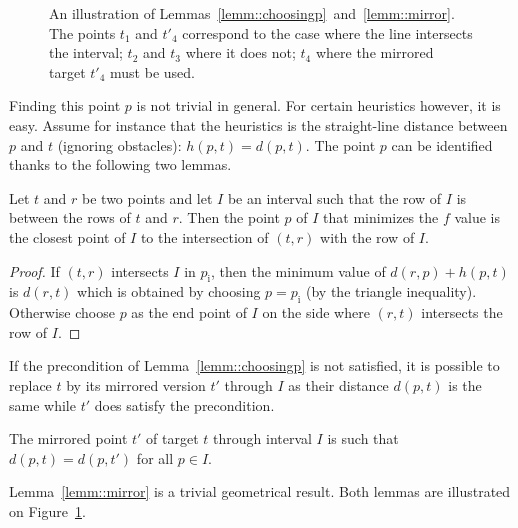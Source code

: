 \begin{figure}[tb]
  \begin{center}
    
  \end{center}
  \caption{An illustration of Lemmas~\ref{lemm::choosingp}~and~\ref{lemm::mirror}.  The points $t_1$ and $t'_4$ correspond to the case 
where the line intersects the interval; 
$t_2$ and $t_3$ where it does not; 
$t_4$ where the mirrored target $t'_4$ must be used.
}
\label{fig::minf}
\end{figure}

Finding this point $p$ %
is not trivial in general.  
For certain heuristics however, 
it is easy.  
Assume for instance 
that the heuristics is the straight-line distance 
between $p$ and $t$ (ignoring obstacles): $h(p,t) = d(p,t)$.  
The point $p$ can be identified 
thanks to the following two lemmas.  

\begin{lemm}\label{lemm::choosingp}
  Let $t$ and $r$ be two points 
  and let $I$ be an interval 
  such that the row of $I$ is between the rows of $t$ and $r$.  
  Then the point $p$ of $I$ 
  that minimizes the $f$ value 
  is the closest point of $I$ to the intersection of $(t,r)$ 
  with the row of $I$.  
\end{lemm}

\begin{proof}
  If $(t,r)$ intersects $I$ in $p_\mathrm{i}$, 
  then the minimum value of $d(r,p) + h(p,t)$ 
  is $d(r,t)$ which is obtained 
  by choosing $p = p_{\mathrm{i}}$ (by the triangle inequality).  
  Otherwise choose $p$ as the end point of $I$ 
  on the side where $(r,t)$ intersects the row of $I$.  
\end{proof}

If the precondition of Lemma~\ref{lemm::choosingp} is not satisfied, 
it is possible to replace $t$ by its mirrored version $t'$ through $I$ 
as their distance $d(p,t)$ is the same 
while $t'$ does satisfy the precondition.  

\begin{lemm}
\label{lemm::mirror}
  The mirrored point $t'$ of target $t$ 
  through interval $I$ is such that   
  $d(p,t) = d(p,t')$ for all $p \in I$.  
\end{lemm}

Lemma~\ref{lemm::mirror} is a trivial geometrical result.  
Both lemmas are illustrated on Figure~\ref{fig::minf}.  

